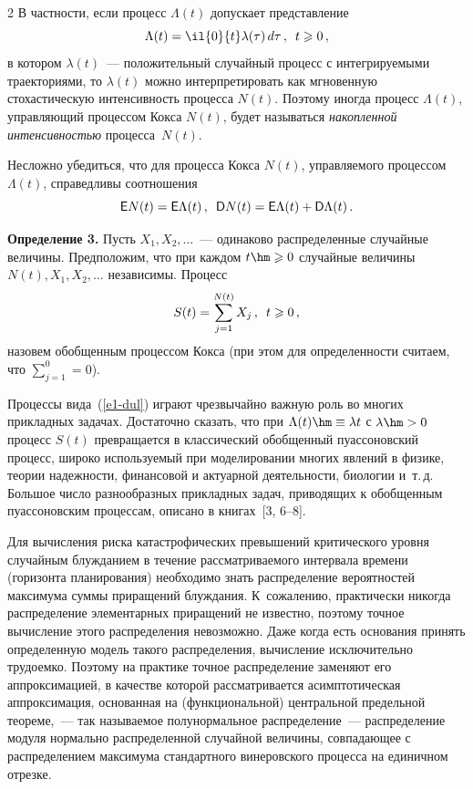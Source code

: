 \begin{multicols}{2}
В частности, если процесс $\Lambda(t)$ допускает представление
$$
\Lambda(t)=\il{0}{t}\lambda(\tau)\,d\tau\,,\enskip t\geqslant 0\,,
$$
в котором $\lambda(t)$~--- положительный случайный процесс с
интегрируемыми траекториями, то $\lambda(t)$ можно
интерпретировать как мгновенную стохастическую интенсивность
процесса $N(t)$. Поэтому \mbox{иногда} процесс $\Lambda(t)$, управ\-ля\-ющий
процессом Кокса $N(t)$, будет называться {\it накопленной
ин\-тен\-сив\-ностью} процесса~$N(t)$.

Несложно убедиться, что для процесса Кокса $N(t)$, управляемого
процессом $\Lambda(t)$, справедливы соотношения
$$
{\sf E}N(t)={\sf E}\Lambda(t)\,,\enskip{\sf D}N(t)={\sf
E}\Lambda(t)+{\sf D}\Lambda(t)\,.
$$

\smallskip

\noindent
\textbf{Определение 3.} Пусть $X_1,X_2,\ldots$~--- одинаково
распределенные случайные величины. Предположим, что при каждом $t\hm\geqslant
 0$ случайные величины $N(t),X_1,X_2,\ldots$ независимы. Процесс
\begin{equation}
S(t)=\sum\limits_{j=1}^{N(t)}X_j\,,\enskip t\geqslant 0\,,
\label{e1-dul}
\end{equation}
назовем обобщенным процессом Кокса (при этом для определенности
считаем, что $\sum\limits_{j=1}^{0} =0$).

\smallskip

Процессы вида~(\ref{e1-dul}) играют чрезвычайно важную роль во многих
прикладных задачах. Достаточно сказать, что при $\Lambda(t) \hm\equiv
\lambda t$ с $\lambda \hm> 0$ процесс $S(t)$ превращается в
классический обобщенный пуассоновский процесс, широко используемый
при моделировании многих явлений в физике, теории надежности,
финансовой и актуарной деятельности, биологии и~т.\,д. Большое число
разнообразных прикладных задач, приводящих к обобщенным
пуассоновским процессам, описано в книгах~[3, 6--8].

Для вычисления риска катастрофических превышений критического уровня
случайным блуж\-да\-ни\-ем в течение рассматриваемого интервала времени
(горизонта планирования) необходимо знать распределение вероятностей
максимума суммы приращений блуждания. К~сожалению, практически
никогда распределение элементарных приращений не известно, поэтому
точное вычисление этого распределения невозможно. Даже когда есть
основания принять определенную модель такого распределения,
вычисление исключительно трудоемко. Поэтому на практике точное
распределение заменяют его аппроксимацией, в качестве которой
рассматривается асимптотическая аппроксимация, основанная на
(функциональной) центральной предельной теореме,~--- так на\-зы\-ва\-емое
полунормальное распределение~--- распределение модуля нормально
распределенной случайной величины, совпадающее с распределением
максимума стандартного винеровского процесса на единичном отрезке.


\end{multicols}
